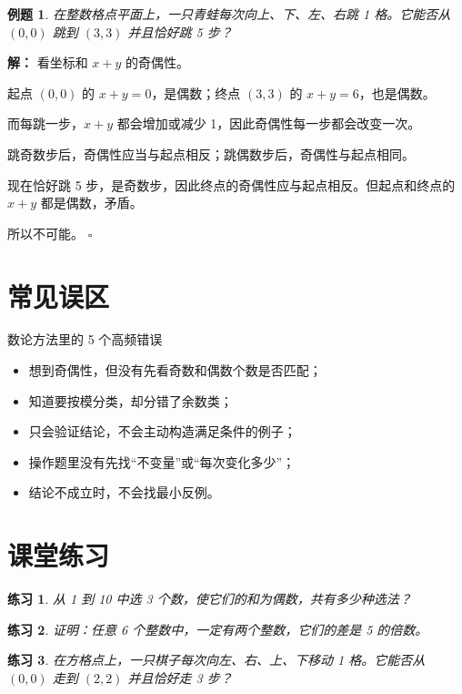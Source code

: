 \documentclass[11pt,a4paper,fontset=fandol]{ctexart}
\theoremstyle{formaltheorem}
\theoremstyle{formalexample}
\newtheorem{example}{例题}[section]
\newtheorem{exercise}{练习}[section]
\newenvironment{solution}{\par\noindent\textbf{解：}}{\hfill$\square$\par}
\begin{document}
\begin{example}
在整数格点平面上，一只青蛙每次向上、下、左、右跳 1 格。它能否从 $(0,0)$ 跳到 $(3,3)$ 并且恰好跳 5 步？
\end{example}

\begin{solution}
看坐标和 $x+y$ 的奇偶性。

起点 $(0,0)$ 的 $x+y=0$，是偶数；终点 $(3,3)$ 的 $x+y=6$，也是偶数。

而每跳一步，$x+y$ 都会增加或减少 1，因此奇偶性每一步都会改变一次。

跳奇数步后，奇偶性应当与起点相反；跳偶数步后，奇偶性与起点相同。

现在恰好跳 5 步，是奇数步，因此终点的奇偶性应与起点相反。但起点和终点的 $x+y$ 都是偶数，矛盾。

所以不可能。
\end{solution}

\section{常见误区}

\begin{notebox}{数论方法里的 5 个高频错误}
\begin{itemize}
  \item 想到奇偶性，但没有先看奇数和偶数个数是否匹配；
  \item 知道要按模分类，却分错了余数类；
  \item 只会验证结论，不会主动构造满足条件的例子；
  \item 操作题里没有先找“不变量”或“每次变化多少”；
  \item 结论不成立时，不会找最小反例。
\end{itemize}
\end{notebox}

\section{课堂练习}

\begin{exercise}
从 1 到 10 中选 3 个数，使它们的和为偶数，共有多少种选法？
\end{exercise}

\begin{exercise}
证明：任意 6 个整数中，一定有两个整数，它们的差是 5 的倍数。
\end{exercise}

\begin{exercise}
在方格点上，一只棋子每次向左、右、上、下移动 1 格。它能否从 $(0,0)$ 走到 $(2,2)$ 并且恰好走 3 步？
\end{exercise}
\end{document}
